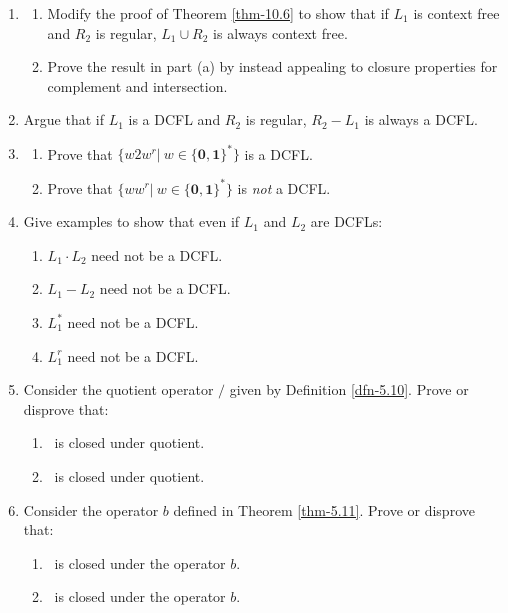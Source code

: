 \begin{enumerate}[{10.}1.]
\item \begin{enumerate}
\item Modify the proof of Theorem \ref{thm-10.6} to show that if $L_1$ is context free and
$R_2$ is regular, $L_1\cup R_2$ is always context free.
\item Prove the result in part (a) by instead appealing to closure properties
for complement and intersection.
\end{enumerate}

\item Argue that if $L_1$ is a DCFL and $R_2$ is regular, $R_2-L_1$ is always a
DCFL.

\item \begin{enumerate}
\item Prove that $\{w2w^r|\ w\in\{\pmb{0},\pmb{1}\}^*\}$ is a DCFL.
\item Prove that $\{ww^r|\ w\in\{\pmb{0},\pmb{1}\}^*\}$ is \emph{not} a DCFL.
\end{enumerate}

\item Give examples to show that even if $L_1$ and $L_2$ are DCFLs:
\begin{enumerate}
\item $L_1\cdot L_2$ need not be a DCFL.
\item $L_1-L_2$ need not be a DCFL.
\item $L^*_1$ need not be a DCFL.
\item $L^r_1$ need not be a DCFL.
\end{enumerate}

\item Consider the quotient operator $/$ given by Definition \ref{dfn-5.10}. Prove or
disprove that:
\begin{enumerate}
\item \PSIG\ is closed under quotient.
\item \ASIG\ is closed under quotient.
\end{enumerate}

\item Consider the operator $b$ defined in Theorem \ref{thm-5.11}. Prove or disprove
that:
\begin{enumerate}
\item \PSIG\ is closed under the operator $b$.
\item \ASIG\ is closed under the operator $b$.
\end{enumerate}


\end{enumerate}

